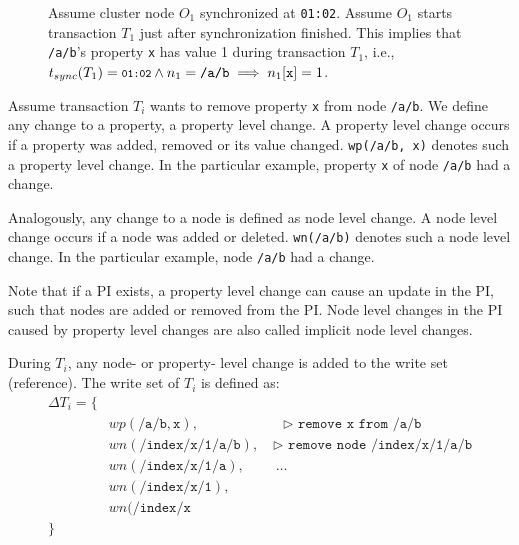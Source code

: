 \documentclass[abstracton,12pt]{scrreprt}
\newenvironment{centerverbatim}{\par\centering\varwidth{\linewidth}\verbatim}
    {\endverbatim\endvarwidth\par}
\begin{document}
\begin{figure}[h]
    \begin{scriptsize}
        \begin{centerverbatim}
[
    { "_id": "0:/", /* ... */ },
    { "_id": "2:/a/b", "x": {
            "r15e830cae80-0-1": 0, /* 01:00 */
            "r15e830d98e0-0-1": 1, /* 01:01 */
            "r15e830f6da0-0-2": 2, /* 01:03 */
        },
        /* ... */
    },
    /* ... */
]
        \end{centerverbatim}
    \end{scriptsize}
    \caption{
        Assume cluster node $O_1$ synchronized at \texttt{01:02}.
        Assume $O_1$ starts transaction $T_1$ just after synchronization finished.
        This implies that \texttt{/a/b}'s property \texttt{x} has value 1 during transaction $T_1$,
        i.e., $ t_{sync}(T_1) = \texttt{\footnotesize01:02} \land n_1 = \texttt{/a/b} \implies n_1[\texttt{x}] = 1$.
    }
    \label{fig:read_example}
\end{figure}

Assume transaction $T_i$ wants to remove property \texttt{x} from node \texttt{/a/b}.
We define any change to a property, a property level change.
A property level change occurs if a property was added, removed or its value changed.
\texttt{wp(/a/b, x)} denotes such a property level change.
In the particular example, property \texttt{x} of node \texttt{/a/b} had a change.

Analogously, any change to a node is defined as node level change.
A node level change occurs if a node was added or deleted.
\texttt{wn(/a/b)} denotes such a node level change.
In the particular example, node \texttt{/a/b} had a change.

Note that if a PI exists, a property level change can cause an update in the PI, such that nodes are added or removed from the PI.
Node level changes in the PI caused by property level changes are also called implicit node level changes.

During $T_i$, any node- or property- level change is added to the write set (reference).
The write set of $T_i$ is defined as:
\begin{equation}
    \begin{split}
\Delta T_i = \{\\
    & wp(\texttt{/a/b}, \texttt{x}), \qquad \qquad \qquad \texttt{$\triangleright$ remove x from /a/b}\\
    & wn(\texttt{/index/x/1/a/b}),\quad \texttt{$\triangleright$ remove node /index/x/1/a/b}\\
    & wn(\texttt{/index/x/1/a}), \qquad \ \dots\\
    & wn(\texttt{/index/x/1}),\\
    & wn(\texttt{/index/x} \\
        \}
    \end{split}
\end{equation}
\end{document}
